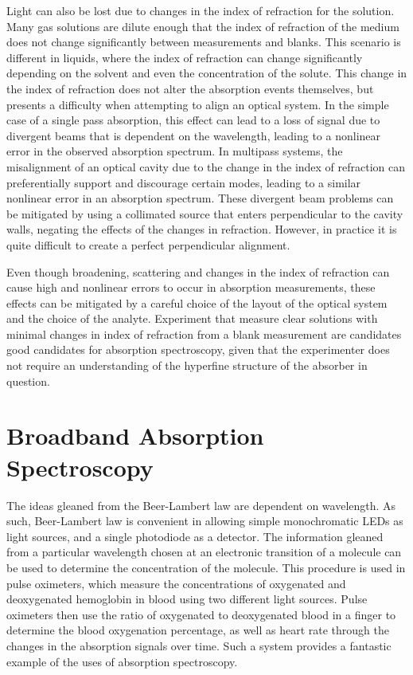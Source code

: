 Light can also be lost due to changes in the index of refraction for the
solution. Many gas solutions are dilute enough that the index of refraction of
the medium does not change significantly between measurements and blanks. This
scenario is different in liquids, where the index of refraction can change
significantly depending on the solvent and even the concentration of the
solute. This change in the index of refraction does not alter the absorption
events themselves, but presents a difficulty when attempting to align an
optical system. In the simple case of a single pass absorption, this effect can
lead to a loss of signal due to divergent beams that is dependent on the
wavelength, leading to a nonlinear error in the observed absorption spectrum.
In multipass systems, the misalignment of an optical cavity due to the change
in the index of refraction can preferentially support and discourage certain
modes, leading to a similar nonlinear error in an absorption spectrum. These
divergent beam problems can be mitigated by using a collimated source that
enters perpendicular to the cavity walls, negating the effects of the changes
in refraction. However, in practice it is quite difficult to create a perfect
perpendicular alignment.

Even though broadening, scattering and changes in the index of refraction
can cause high and nonlinear errors to occur in absorption measurements,
these effects can be mitigated by a careful choice of the layout of the
optical system and the choice of the analyte. Experiment that measure clear
solutions with minimal changes in index of refraction from a blank measurement
are candidates good candidates for absorption spectroscopy, given that the
experimenter does not require an understanding of the hyperfine structure of
the absorber in question.

\section{Broadband Absorption Spectroscopy}

The ideas gleaned from the Beer-Lambert law are dependent on wavelength. As
such, Beer-Lambert law is convenient in allowing simple monochromatic \acp{LED}
as light sources, and a single photodiode as a detector. The information
gleaned from a particular wavelength chosen at an electronic transition of a
molecule can be used to determine the concentration of the molecule. This
procedure is used in pulse oximeters, which measure the concentrations of
oxygenated and deoxygenated hemoglobin in blood using two different light
sources. Pulse oximeters then use the ratio of oxygenated to deoxygenated blood
in a finger to determine the blood oxygenation percentage, as well as heart
rate through the changes in the absorption signals over time. Such a system
provides a fantastic example of the uses of absorption spectroscopy.

